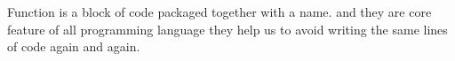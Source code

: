 Function 
  is a block of code packaged together with a name. 
  and they are core feature of all programming language 
  they help us to avoid writing the same lines of code again and again.